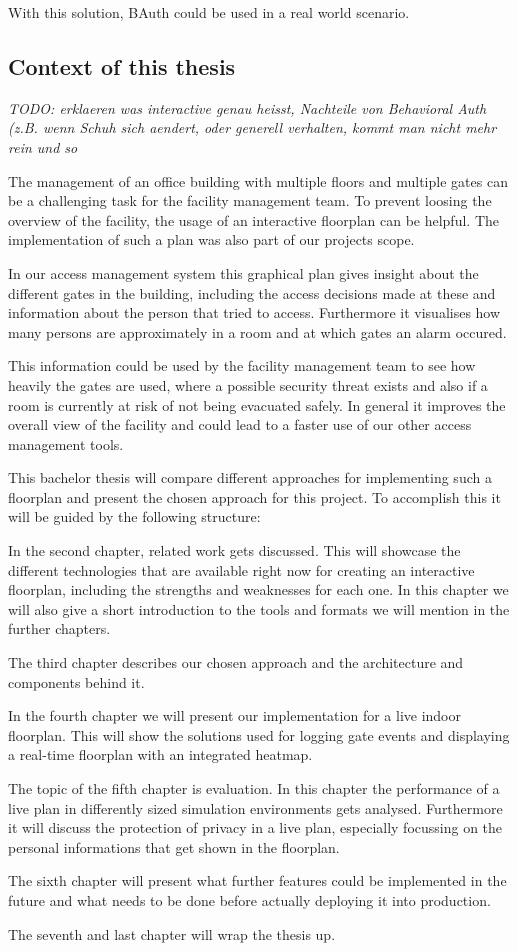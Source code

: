 With this solution, BAuth could be used in a real world scenario.

\subsection{Context of this thesis}
\label{Context of this thesis}

\emph{TODO: erklaeren was interactive genau heisst, Nachteile von Behavioral Auth (z.B. wenn Schuh sich aendert, oder generell verhalten, kommt man nicht mehr rein und so}

The management of an office building with multiple floors and multiple gates can be a challenging task for the facility management team. To prevent loosing the overview of the facility, the usage of an interactive floorplan can be helpful. The implementation of such a plan was also part of our projects scope.

In our access management system this graphical plan gives insight about the different gates in the building, including the access decisions made at these and information about the person that tried to access. Furthermore it visualises how many persons are approximately in a room and at which gates an alarm occured. 

This information could be used by the facility management team to see how heavily the gates are used, where a possible security threat exists and also if a room is currently at risk of not being evacuated safely. 
In general it improves the overall view of the facility and could lead to a faster use of our other access management tools.

This bachelor thesis will compare different approaches for implementing such a floorplan and present the chosen approach for this project. To accomplish this it will be guided by the following structure:

In the second chapter, related work gets discussed. This will showcase the different technologies that are available right now for creating an interactive floorplan, including the strengths and weaknesses for each one. In this chapter we will also give a short introduction to the tools and formats we will mention in the further chapters.

The third chapter describes our chosen approach and the architecture and components behind it.

In the fourth chapter we will present our implementation for a live indoor floorplan. This will show the solutions used for logging gate events and displaying a real-time floorplan with an integrated heatmap.

The topic of the fifth chapter is evaluation. In this chapter the performance of a live plan in differently sized simulation environments gets analysed. Furthermore it will discuss the protection of privacy in a live plan, especially focussing on the personal informations that get shown in the floorplan.

The sixth chapter will present what further features could be implemented in the future and what needs to be done before actually deploying it into production. 

The seventh and last chapter will wrap the thesis up.

\clearpage